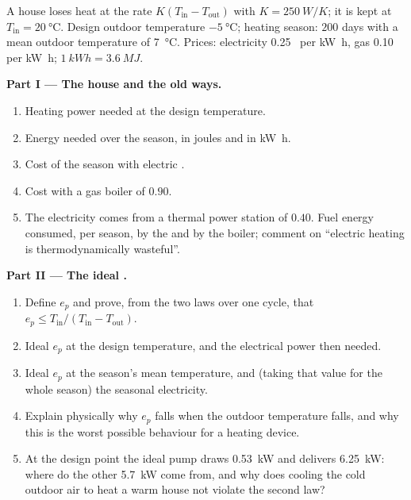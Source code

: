 \begin{problem}
\label{pb:b1:heat-engines:1}
A house loses heat at the rate $K(T_{\mathrm{in}} - T_{\mathrm{out}})$ with
$K = \qty{250}{W/K}$; it is kept at $T_{\mathrm{in}} = \qty{20}{\degreeCelsius}$.
Design outdoor temperature $\qty{-5}{\degreeCelsius}$; heating season:
$200$ days with a mean outdoor temperature of \qty{7}{\degreeCelsius}.
Prices: electricity 0.25~\texteuro{} per \unit{kW h}, gas 0.10~\texteuro{} per
\unit{kW h}; $\qty{1}{kW h} = \qty{3.6}{MJ}$.

\medskip
\noindent\textbf{Part I --- The house and the old ways.}
\begin{enumerate}
  \item Heating power needed at the design temperature.
  \item Energy needed over the season, in joules and in \unit{kW h}.
  \item Cost of the season with electric .
  \item Cost with a gas boiler of  $0.90$.
  \item The electricity comes from a thermal power station of 
        $0.40$. Fuel energy consumed, per season, by the  and by
        the boiler; comment on ``electric heating is thermodynamically
        wasteful''.
\end{enumerate}

\medskip
\noindent\textbf{Part II --- The ideal .}
\begin{enumerate}[resume]
  \item Define $e_p$ and prove, from the two laws over one cycle, that
        $e_p \leq T_{\mathrm{in}}/(T_{\mathrm{in}} - T_{\mathrm{out}})$.
  \item Ideal $e_p$ at the design temperature, and the electrical power
        then needed.
  \item Ideal $e_p$ at the season's mean temperature, and (taking that
        value for the whole season) the seasonal electricity.
  \item Explain physically why $e_p$ falls when the outdoor temperature
        falls, and why this is the worst possible behaviour for a heating
        device.
  \item At the design point the ideal pump draws \qty{0.53}{kW} and
        delivers \qty{6.25}{kW}: where do the other \qty{5.7}{kW} come from,
        and why does cooling the cold outdoor air to heat a warm house
        not violate the second law?
\end{enumerate}


\end{problem}
